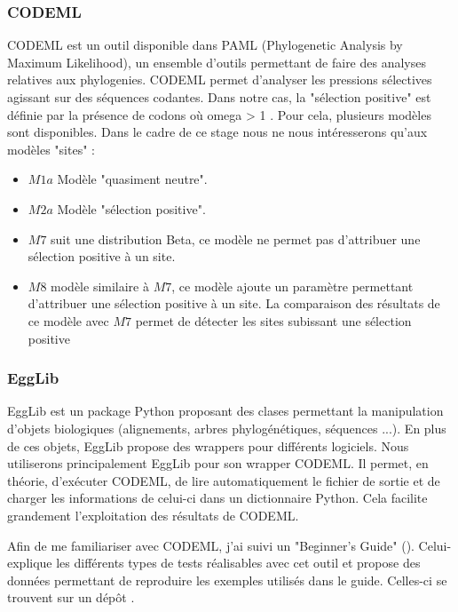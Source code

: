\documentclass[../main]{subfiles} %
\begin{document}
\subsubsection{CODEML}
\label{sec:CODEML}
\gls{CODEML} est un outil disponible dans \gls{PAML} (Phylogenetic Analysis by Maximum Likelihood), un ensemble d'outils permettant de faire des analyses relatives aux \glspl{phylogenie}. \gls{CODEML} permet d'analyser les pressions sélectives agissant sur des séquences codantes. Dans notre cas, la "sélection positive" est définie par la présence de \glspl{codon} où \acrshort{omega} > 1  \cite{alvarez-carretero_beginners_2023}. Pour cela, plusieurs modèles sont disponibles. Dans le cadre de ce stage nous ne nous intéresserons qu'aux modèles "sites" :
\begin{itemize}
    \item $M1a$ Modèle "quasiment neutre".  \cite{alvarez-carretero_beginners_2023}
    \item $M2a$ Modèle "sélection positive". \cite{alvarez-carretero_beginners_2023}
    \item $M7$ suit une distribution Beta, ce modèle ne permet pas d'attribuer une sélection positive à un site. \cite{yang_codon-substitution_2000}
    \item $M8$ modèle similaire à $M7$, ce modèle ajoute un paramètre permettant d'attribuer une sélection positive à un site. La comparaison des résultats de ce modèle avec $M7$ permet de détecter les sites subissant une sélection positive \cite{yang_codon-substitution_2000}

\end{itemize}


\subsubsection{EggLib}
\label{sec:EggLib}
\gls{EggLib} est un package \gls{Python} proposant des clases permettant la manipulation d'objets biologiques (alignements, arbres phylogénétiques, séquences ...). En plus de ces objets, \gls{EggLib} propose des \glspl{wrapper} pour différents logiciels. Nous utiliserons principalement \gls{EggLib} pour son \gls{wrapper} \gls{CODEML}. Il permet, en théorie, d'exécuter \gls{CODEML}, de lire automatiquement le fichier de sortie et de charger les informations de celui-ci dans un dictionnaire \gls{Python}. Cela facilite grandement l'exploitation des résultats de \gls{CODEML}.

\label{sec:FamiCodeml}
Afin de me familiariser avec \gls{CODEML}, j'ai suivi un "Beginner's Guide" (\cite{alvarez-carretero_beginners_2023}). Celui-explique les différents types de tests réalisables avec cet outil et propose des données permettant de reproduire les exemples utilisés dans le guide. Celles-ci se trouvent sur un dépôt \GitHub \cite{noauthor_paml-tutorialpositive-selection_nodate}.
\end{document}

